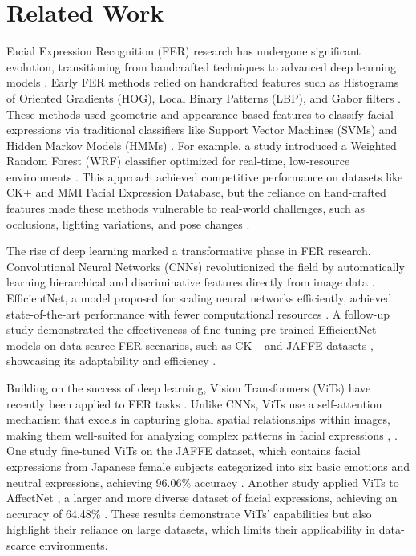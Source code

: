 \documentclass[sigconf]{acmart}
\begin{document}
\section{Related Work}

Facial Expression Recognition (FER) research has undergone significant evolution, transitioning from handcrafted techniques to advanced deep learning models \cite{kopalidis2024advances}. Early FER methods relied on handcrafted features such as Histograms of Oriented Gradients (HOG), Local Binary Patterns (LBP), and Gabor filters \cite{kopalidis2024advances}. These methods used geometric and appearance-based features to classify facial expressions via traditional classifiers like Support Vector Machines (SVMs) and Hidden Markov Models (HMMs) \cite{kopalidis2024advances}. For example, a study introduced a Weighted Random Forest (WRF) classifier optimized for real-time, low-resource environments \cite{jeong2018}. This approach achieved competitive performance on datasets like CK+ and MMI Facial Expression Database, but the reliance on hand-crafted features made these methods vulnerable to real-world challenges, such as occlusions, lighting variations, and pose changes \cite{kopalidis2024advances}.

The rise of deep learning marked a transformative phase in FER research. Convolutional Neural Networks (CNNs) revolutionized the field by automatically learning hierarchical and discriminative features directly from image data \cite{kopalidis2024advances}. EfficientNet, a model proposed for scaling neural networks efficiently, achieved state-of-the-art performance with fewer computational resources \cite{tan2019}. A follow-up study demonstrated the effectiveness of fine-tuning pre-trained EfficientNet models on data-scarce FER scenarios, such as CK+ and JAFFE datasets \cite{lyons1998japanese}, showcasing its adaptability and efficiency \cite{alam2022}.

Building on the success of deep learning, Vision Transformers (ViTs) have recently been applied to FER tasks \cite{dosovitskiy2020image}. Unlike CNNs, ViTs use a self-attention mechanism that excels in capturing global spatial relationships within images, making them well-suited for analyzing complex patterns in facial expressions \cite{dosovitskiy2020image}, \cite{kopalidis2024advances}. One study fine-tuned ViTs on the JAFFE dataset, which contains facial expressions from Japanese female subjects categorized into six basic emotions and neutral expressions, achieving 96.06\% accuracy \cite{febrian2024}. Another study applied ViTs to AffectNet \cite{8013713}, a larger and more diverse dataset of facial expressions, achieving an accuracy of 64.48\% \cite{roka2023}. These results demonstrate ViTs' capabilities but also highlight their reliance on large datasets, which limits their applicability in data-scarce environments.
\end{document}
